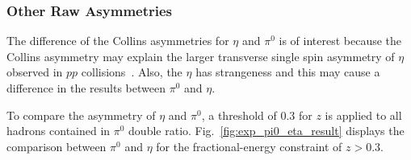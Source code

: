 \subsubsection{\texorpdfstring{Other Raw Asymmetries}{Other Raw asymmetries}}

The difference of the Collins asymmetries for $\eta$ and $\pi^0$ is of interest because the Collins asymmetry may explain the larger transverse single spin asymmetry of $\eta$ observed in $pp$ collisions~\cite{StarTSSA2}. Also, the $\eta$ has strangeness and this may cause a difference in the results  between $\pi^0$ and $\eta$.
 
To compare the asymmetry of $\eta$ and $\pi^0$, a threshold of $0.3$ for $z$ is applied to all hadrons contained in $\pi^0$ double ratio. Fig.~\ref{fig:exp_pi0_eta_result} displays  the comparison between $\pi^0$ and $\eta$ for the fractional-energy constraint of $z>0.3$. 

